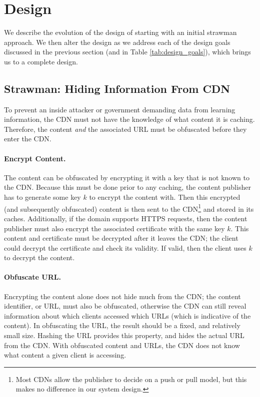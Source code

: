 \section{Design}
\label{sec:design}
We describe the evolution of the design of \system{} starting with an initial strawman approach.  We then 
alter the design as we address each of the design goals discussed in the previous section (and in Table \ref{tab:design_goals}), which brings us 
to a complete design.

\subsection{Strawman: Hiding Information From CDN}
\label{sec:obfuscate_content}
To prevent an inside attacker or government demanding data from learning information, the CDN 
must not have the knowledge of what content it is caching.  Therefore, the content {\it and} the 
associated URL must be obfuscated before they enter the CDN.  

\paragraph{Encrypt Content.}  The content can be obfuscated by encrypting it with a key that is not 
known to the CDN.  Because this must be done prior to any caching, the content publisher 
has to generate some key $k$ to encrypt the content with.  Then this encrypted (and subsequently 
obfuscated) content is then sent to the CDN\footnote{Most CDNs
allow the publisher to decide on a push or pull model, but this makes no difference in our 
system design.} and stored in its caches.  
Additionally, if the domain supports HTTPS requests, then the content publisher must also encrypt the 
associated certificate with the same key $k$.  This content and certificate must be decrypted after 
it leaves the CDN; the client could decrypt the certificate and check its validity.  If valid, then 
the client uses $k$ to decrypt the content.  

\paragraph{Obfuscate URL.} Encrypting the content alone does not hide much from the CDN; the content 
identifier, or URL, must also be obfuscated, otherwise the CDN can still reveal information about 
which clients accessed which URLs (which is indicative of the content).  In obfuscating the 
URL, the result should be a fixed, and relatively small size.  Hashing the URL provides this 
property, and hides the actual URL from the CDN. With obfuscated content and 
URLs, the CDN does not know what content a given client is accessing.

